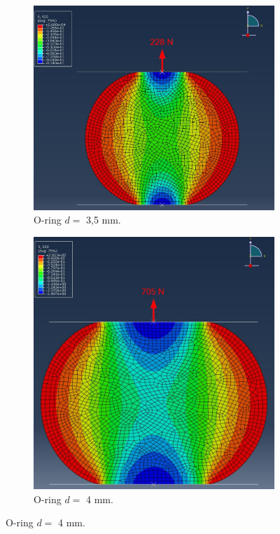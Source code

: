 \documentclass[10pt,a4paper,oneside,fleqn]{article}
\begin{document}
\begin{figure}[h]
	\begin{subfigure}{0.55\textwidth}
		\centering
		\includegraphics[width=1\textwidth]{2023-02-09-3mm5}
		\caption{O-ring $d=$ 3,5 mm.}
		\label{fig:2023-02-09-3mm5}
	\end{subfigure}
	\begin{subfigure}{0.45\textwidth}
		\centering
		\includegraphics[width=1\textwidth]{2023-02-09-4mm}
		\caption{O-ring $d=$ 4 mm.}
		\label{fig:2023-02-09-4mm}
	\end{subfigure}
\end{figure}
\end{document}

